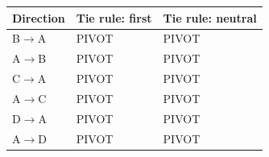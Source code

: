 \begin{tabular}{lll}
\hline
Direction & Tie rule: first & Tie rule: neutral \\
\hline
B$\to$A & PIVOT & PIVOT \\
A$\to$B & PIVOT & PIVOT \\
C$\to$A & PIVOT & PIVOT \\
A$\to$C & PIVOT & PIVOT \\
D$\to$A & PIVOT & PIVOT \\
A$\to$D & PIVOT & PIVOT \\
\hline
\end{tabular}
